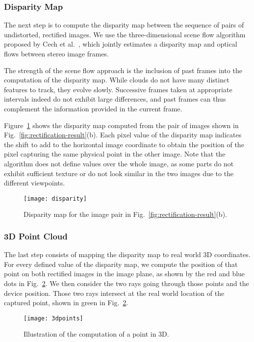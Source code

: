 \subsubsection{Disparity Map}
The next step is to compute the disparity map between the sequence of pairs of undistorted, rectified images. We use the three-dimensional scene flow algorithm proposed by Cech et al.\ \cite{cech}, which jointly estimates a disparity map and optical flows between stereo image frames.

The strength of the scene flow approach is the inclusion of past frames into the computation of the disparity map. While clouds do not have many distinct features to track, they evolve slowly. Successive frames taken at appropriate intervals indeed do not exhibit large differences, and past frames can thus complement the information provided in the current frame.

Figure~\ref{fig:disparity} shows the disparity map computed from the pair of images shown in Fig.~\ref{fig:rectification-result}(b). Each pixel value of the disparity map indicates the shift to add to the horizontal image coordinate to obtain the position of the pixel capturing the same physical point in the other image. Note that the algorithm does not define values over the whole image, as some parts do not exhibit sufficient texture or do not look similar in the two images due to the different viewpoints.

\begin{figure}[htb]
\centering
\texttt{[image: disparity]}
\caption[Illustration of the computed disparity map.]{Disparity map for the image pair in Fig.~\ref{fig:rectification-result}(b).}
\label{fig:disparity}
\end{figure}

\subsubsection{3D Point Cloud}
The last step consists of mapping the disparity map to real world 3D coordinates. For every defined value of the disparity map, we compute the position of that point on both rectified images in the image plane, as shown by the red and blue dots in Fig.~\ref{fig:3dpoints}. We then consider the two rays going through those points and the device position. Those two rays intersect at the real world location of the captured point, shown in green in Fig.~\ref{fig:3dpoints}.

\begin{figure}[htb]
\centering
\texttt{[image: 3dpoints]}
\caption{Illustration of the computation of a point in 3D.}
\label{fig:3dpoints}
\end{figure}

